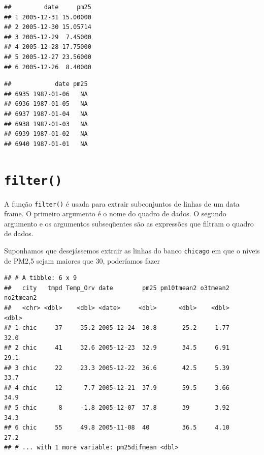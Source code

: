 \documentclass[]{book}
\newenvironment{Shaded}{\begin{snugshade}}{\end{snugshade}}
\newcommand{\DecValTok}[1]{\textcolor[rgb]{0.00,0.00,0.81}{#1}}
\newcommand{\KeywordTok}[1]{\textcolor[rgb]{0.13,0.29,0.53}{\textbf{#1}}}
\newcommand{\NormalTok}[1]{#1}
\newcommand{\OperatorTok}[1]{\textcolor[rgb]{0.81,0.36,0.00}{\textbf{#1}}}
\newcommand{\StringTok}[1]{\textcolor[rgb]{0.31,0.60,0.02}{#1}}
\begin{document}
\begin{verbatim}
##         date     pm25
## 1 2005-12-31 15.00000
## 2 2005-12-30 15.05714
## 3 2005-12-29  7.45000
## 4 2005-12-28 17.75000
## 5 2005-12-27 23.56000
## 6 2005-12-26  8.40000
\end{verbatim}

\begin{Shaded}
\end{Shaded}

\begin{verbatim}
##            date pm25
## 6935 1987-01-06   NA
## 6936 1987-01-05   NA
## 6937 1987-01-04   NA
## 6938 1987-01-03   NA
## 6939 1987-01-02   NA
## 6940 1987-01-01   NA
\end{verbatim}

\hypertarget{filter}{%
\section{\texorpdfstring{\texttt{filter()}}{filter()}}\label{filter}}

A função \texttt{filter()} é usada para extrair subconjuntos de linhas de um data frame. O primeiro argumento é o nome do quadro de dados. O segundo argumento e os argumentos subseqüentes são as expressões que filtram o quadro de dados.

Suponhamos que desejássemos extrair as linhas do banco \texttt{chicago} em que o níveis de PM2,5 sejam maiores que 30, poderíamos fazer

\begin{Shaded}
\end{Shaded}

\begin{verbatim}
## # A tibble: 6 x 9
##   city   tmpd Temp_Orv date        pm25 pm10tmean2 o3tmean2 no2tmean2
##   <chr> <dbl>    <dbl> <date>     <dbl>      <dbl>    <dbl>     <dbl>
## 1 chic     37     35.2 2005-12-24  30.8       25.2     1.77      32.0
## 2 chic     41     32.6 2005-12-23  32.9       34.5     6.91      29.1
## 3 chic     22     23.3 2005-12-22  36.6       42.5     5.39      33.7
## 4 chic     12      7.7 2005-12-21  37.9       59.5     3.66      34.9
## 5 chic      8     -1.8 2005-12-07  37.8       39       3.92      34.3
## 6 chic     55     49.8 2005-11-08  40         36.5     4.10      27.2
## # ... with 1 more variable: pm25difmean <dbl>
\end{verbatim}
\end{document}
